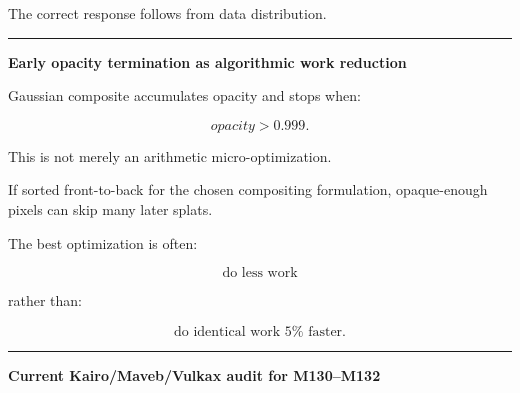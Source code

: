 The correct response follows from data distribution.

\begin{center}\rule{0.5\linewidth}{0.5pt}\end{center}

\textbf{Early opacity termination as algorithmic work reduction}

Gaussian composite accumulates opacity and stops when:

\[
opacity>0.999.
\]

This is not merely an arithmetic micro-optimization.

If sorted front-to-back for the chosen compositing formulation, opaque-enough pixels can skip many later splats.

The best optimization is often:

\[
\boxed{
\text{do less work}
}
\]

rather than:

\[
\text{do identical work 5%
\]

\begin{center}\rule{0.5\linewidth}{0.5pt}\end{center}

\textbf{Current Kairo/Maveb/Vulkax audit for M130--M132}

